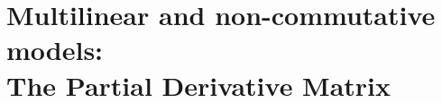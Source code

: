 \onehalfspace
{}
\part[Multilinear and non-commutative models]{Multilinear and non-commutative models:\\The Partial Derivative Matrix}


\ignore{








}



